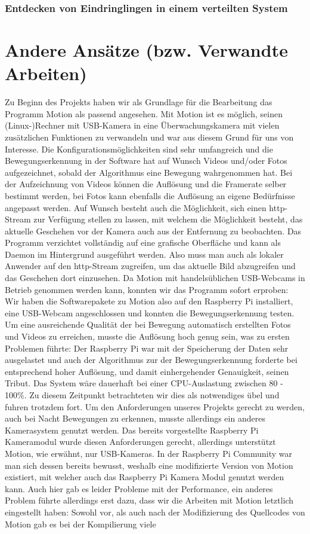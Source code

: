 \documentclass[journal]{IEEEtran}
\begin{document}
\subsubsection{Entdecken von Eindringlingen in einem verteilten System}



\section{Andere Ansätze (bzw. Verwandte Arbeiten)}
Zu Beginn des Projekts haben wir als Grundlage für die Bearbeitung das Programm Motion\cite{motion} als passend angesehen. Mit Motion ist es möglich, seinen (Linux-)Rechner mit USB-Kamera in eine Überwachungskamera mit vielen zusätzlichen Funktionen zu verwandeln und war aus diesem Grund für uns von Interesse. Die Konfigurationsmöglichkeiten sind sehr umfangreich und die Bewegungserkennung in der Software hat auf Wunsch Videos und/oder Fotos aufgezeichnet, sobald der Algorithmus eine Bewegung wahrgenommen hat. Bei der Aufzeichnung von Videos können die Auflösung und die Framerate selber bestimmt werden, bei Fotos kann ebenfalls die Auflösung an eigene Bedürfnisse angepasst werden. Auf Wunsch besteht auch die Möglichkeit, sich einen http-Stream zur Verfügung stellen zu lassen, mit welchem die Möglichkeit besteht, das aktuelle Geschehen vor der Kamera auch aus der Entfernung zu beobachten. Das Programm verzichtet vollständig auf eine grafische Oberfläche und kann als Daemon im Hintergrund ausgeführt werden. Also muss man auch als lokaler Anwender auf den http-Stream zugreifen, um das aktuelle Bild abzugreifen und das Geschehen dort einzusehen. Da Motion mit handelsüblichen USB-Webcams in Betrieb genommen werden kann, konnten wir das Programm sofort erproben: \\ Wir haben die Softwarepakete zu Motion also auf den Raspberry Pi installiert, eine USB-Webcam angeschlossen und konnten die Bewegungserkennung testen. Um eine ausreichende Qualität der bei Bewegung automatisch erstellten Fotos und Videos zu erreichen, musste die Auflösung hoch genug sein, was zu ersten Problemen führte: Der Raspberry Pi war mit der Speicherung der Daten sehr ausgelastet und auch der Algorithmus zur der Bewegungserkennung forderte bei entsprechend hoher Auflösung, und damit einhergehender Genauigkeit, seinen Tribut. Das System wäre dauerhaft bei einer CPU-Auslastung zwischen 80 - 100\%. Zu diesem Zeitpunkt betrachteten wir dies als notwendiges übel und fuhren trotzdem fort. Um den Anforderungen unseres Projekts gerecht zu werden, auch bei Nacht Bewegungen zu erkennen, musste allerdings ein anderes Kamerasystem genutzt werden. Das bereits vorgestellte Raspberry Pi Kameramodul wurde diesen Anforderungen gerecht, allerdings unterstützt Motion, wie erwähnt, nur USB-Kameras. In der Raspberry Pi Community war man sich dessen bereits bewusst, weshalb eine modifizierte Version von Motion existiert, mit welcher auch das Raspberry Pi Kamera Modul genutzt werden kann. Auch hier gab es leider Probleme mit der Performance, ein anderes Problem führte allerdings erst dazu, dass wir die Arbeiten mit Motion letztlich eingestellt haben: Sowohl vor, als auch nach der Modifizierung des Quellcodes von Motion gab es bei der Kompilierung viele 
\end{document}
